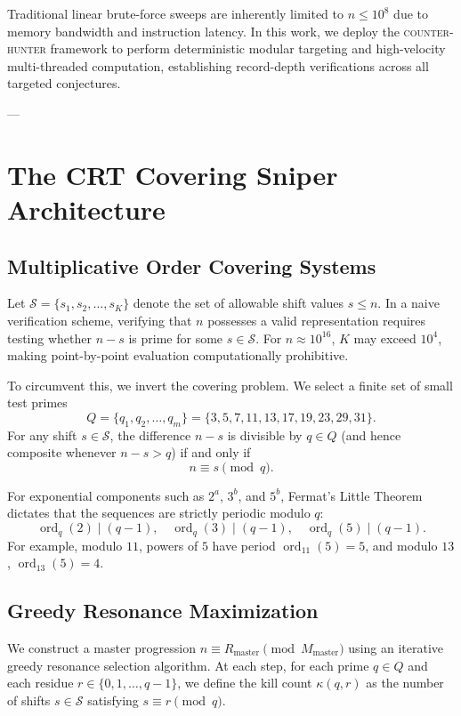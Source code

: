 \documentclass[11pt,a4paper]{article}
\theoremstyle{definition}
\theoremstyle{remark}
\begin{document}
Traditional linear brute-force sweeps are inherently limited to $n \le 10^8$ due to memory bandwidth and instruction latency. In this work, we deploy the \textsc{counter-hunter} framework to perform deterministic modular targeting and high-velocity multi-threaded computation, establishing record-depth verifications across all targeted conjectures.

---

\section{The CRT Covering Sniper Architecture}

\subsection{Multiplicative Order Covering Systems}
Let $\mathcal{S} = \{s_1, s_2, \dots, s_K\}$ denote the set of allowable shift values $s \le n$. In a naive verification scheme, verifying that $n$ possesses a valid representation requires testing whether $n - s$ is prime for some $s \in \mathcal{S}$. For $n \approx 10^{16}$, $K$ may exceed $10^4$, making point-by-point evaluation computationally prohibitive.

To circumvent this, we invert the covering problem. We select a finite set of small test primes
\begin{equation}
Q = \{q_1, q_2, \dots, q_m\} = \{3, 5, 7, 11, 13, 17, 19, 23, 29, 31\}.
\end{equation}
For any shift $s \in \mathcal{S}$, the difference $n - s$ is divisible by $q \in Q$ (and hence composite whenever $n - s > q$) if and only if
\begin{equation}
n \equiv s \pmod q.
\end{equation}

For exponential components such as $2^a$, $3^b$, and $5^b$, Fermat's Little Theorem dictates that the sequences are strictly periodic modulo $q$:
\begin{equation}
\operatorname{ord}_q(2) \mid (q - 1), \quad \operatorname{ord}_q(3) \mid (q - 1), \quad \operatorname{ord}_q(5) \mid (q - 1).
\end{equation}
For example, modulo $11$, powers of $5$ have period $\operatorname{ord}_{11}(5) = 5$, and modulo $13$, $\operatorname{ord}_{13}(5) = 4$.

\subsection{Greedy Resonance Maximization}
We construct a master progression $n \equiv R_{\text{master}} \pmod{M_{\text{master}}}$ using an iterative greedy resonance selection algorithm. At each step, for each prime $q \in Q$ and each residue $r \in \{0, 1, \dots, q-1\}$, we define the kill count $\kappa(q, r)$ as the number of shifts $s \in \mathcal{S}$ satisfying $s \equiv r \pmod q$.
\end{document}
